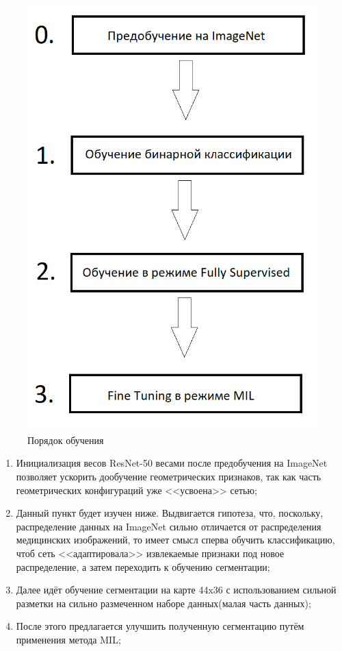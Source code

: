 \begin{figure}[h] 
  \center
  \includegraphics [scale=0.6] {images/schema.png}
  \caption{Порядок обучения} 
  \label{fig:schema_order}  
\end{figure}


\begin{enumerate}[start=0]
    \item Инициализация весов ResNet-50 весами после предобучения на ImageNet позволяет ускорить дообучение геометрических признаков, так как часть геометрических конфигураций уже <<усвоена>> сетью;
    \item Данный пункт будет изучен ниже. Выдвигается гипотеза, что, поскольку, распределение данных на ImageNet сильно отличается от распределения медицинских изображений, то имеет смысл сперва обучить классификацию, чтоб сеть <<адаптировала>> извлекаемые признаки под новое распределение, а затем переходить к обучению сегментации;  
    \item Далее идёт обучение сегментации на карте 44x36 с использованием сильной разметки на сильно размеченном наборе данных(малая часть данных);
    \item После этого предлагается улучшить полученную сегментацию путём применения метода MIL;
\end{enumerate}

